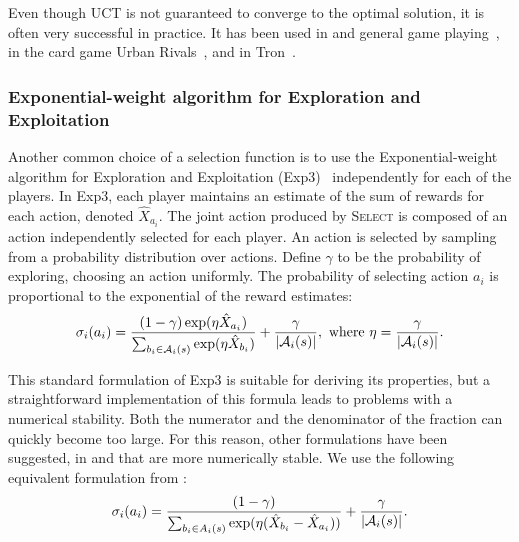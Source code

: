 Even though UCT is not guaranteed to converge to the optimal solution, it is often very successful in practice.
It has been used in and general game playing~\cite{Finnsson12}, in the card game Urban Rivals~\cite{Teytaud11Upper},
and in Tron~\cite{Perick12Comparison}.


\subsubsection{Exponential-weight algorithm for Exploration and Exploitation}\label{sec:exp3}

Another common choice of a selection function is to use the Exponential-weight algorithm for Exploration and Exploitation (Exp3)~\cite{Auer2003Exp3} independently for each of the players.
In Exp3, each player maintains an estimate of the sum of rewards for each action, denoted $\hat{X}_{a_i}$.
The joint action produced by \textsc{Select} is composed of an action independently selected for each player.
An action is selected by sampling from a probability distribution over actions.
Define $\gamma$ to be the probability of exploring, \ie choosing an action uniformly.
The probability of selecting action $a_i$ is proportional to the exponential of the reward estimates:
\begin{equation}\label{eq:exp3select}
\sigma_i(a_i) = \frac{(1-\gamma) \exp(\eta \hat{X}_{a_i})}{\sum_{b_i \in \mathcal{A}_i(s)} \exp(\eta \hat{X}_{b_i})} + \frac{\gamma}{|\mathcal{A}_i(s)|},
  \mbox{ where } \eta = \frac{\gamma}{|\mathcal{A}_i(s)|}.
\end{equation}

This standard formulation of Exp3 is suitable for deriving its properties, but a straightforward implementation of this formula leads to problems with a numerical stability. Both the numerator and the denominator of the fraction can quickly become too large. For this reason, other formulations have been suggested, \eg in \cite{Lanctot13Goofspiel} and \cite{Cowling12ISMCTS} that are more numerically stable. We use the following equivalent formulation from \cite{Cowling12ISMCTS}:
\begin{equation} \label{eq:exp3:stable}
\sigma_i(a_i) = \frac{(1-\gamma)}{\sum_{b_i \in A_i(s)}\exp(\eta(\hat{X}_{b_i}-\hat{X}_{a_i}))} + \frac{\gamma}{|\mathcal{A}_i(s)|}.
\end{equation}

